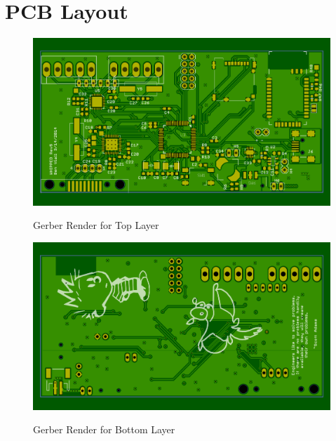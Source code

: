 \chapter{PCB Layout}


\label{chap:PCB_LAYOUT}

\begin{figure}
\begin{center}
	\label{fig:TOPGerber}
	\includegraphics[angle=0,scale=1,width=.95\textwidth]{Images/Rev5_TOPGERB.png} 
	\caption{Gerber Render for Top Layer}
\end{center}
\end{figure}


\begin{figure}
\begin{center}
	\label{fig:BOTGerber}
	\includegraphics[angle=0,scale=1,width=.95\textwidth]{Images/Rev5_BOTGERB.png} 
	\caption{Gerber Render for Bottom Layer}
\end{center}
\end{figure}


